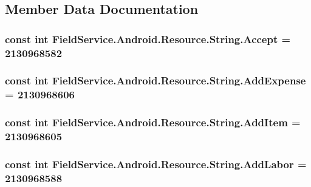 \subsection{Member Data Documentation}
\hypertarget{class_field_service_1_1_android_1_1_resource_1_1_string_aebc9a538a9f823cecdf91809f2181b34}{
\subsubsection[{Accept}]{\setlength{\rightskip}{0pt plus 5cm}const int Field\+Service.\+Android.\+Resource.\+String.\+Accept = 2130968582}}\label{class_field_service_1_1_android_1_1_resource_1_1_string_aebc9a538a9f823cecdf91809f2181b34}
\hypertarget{class_field_service_1_1_android_1_1_resource_1_1_string_a7c8fae7622cc26d7b887c0a18dd8b0f9}{
\subsubsection[{Add\+Expense}]{\setlength{\rightskip}{0pt plus 5cm}const int Field\+Service.\+Android.\+Resource.\+String.\+Add\+Expense = 2130968606}}\label{class_field_service_1_1_android_1_1_resource_1_1_string_a7c8fae7622cc26d7b887c0a18dd8b0f9}
\hypertarget{class_field_service_1_1_android_1_1_resource_1_1_string_a143eba02cb4ed18bb3982046c739c542}{
\subsubsection[{Add\+Item}]{\setlength{\rightskip}{0pt plus 5cm}const int Field\+Service.\+Android.\+Resource.\+String.\+Add\+Item = 2130968605}}\label{class_field_service_1_1_android_1_1_resource_1_1_string_a143eba02cb4ed18bb3982046c739c542}
\hypertarget{class_field_service_1_1_android_1_1_resource_1_1_string_ad1d40ff651112b2138af2eb40a3e938f}{
\subsubsection[{Add\+Labor}]{\setlength{\rightskip}{0pt plus 5cm}const int Field\+Service.\+Android.\+Resource.\+String.\+Add\+Labor = 2130968588}}\label{class_field_service_1_1_android_1_1_resource_1_1_string_ad1d40ff651112b2138af2eb40a3e938f}
